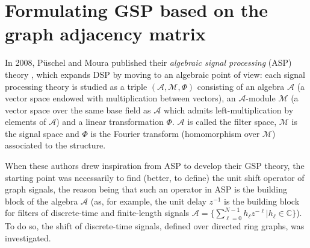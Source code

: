\section{Formulating GSP based on the graph adjacency matrix}
\label{sec:DSPG}

In 2008, P\"uschel and Moura published their \emph{algebraic signal processing} (ASP) theory \cite{puschel2008time,puschel2008space}, which expands DSP by moving to an algebraic point of view: each signal processing theory is studied as a triple $ (\mathscr{A}, \mathscr{M}, \Phi) $ consisting of an algebra $ \mathscr{A} $ (a vector space endowed with multiplication between vectors), an $ \mathscr{A} $-module $ \mathscr{M} $ (a vector space over the same base field as $ \mathscr{A} $ which admits left-multiplication by elements of $ \mathscr{A} $) and a linear transformation $ \Phi $. $ \mathscr{A} $ is called the filter space, $ \mathscr{M} $ is the signal space and $ \Phi $ is the Fourier transform (homomorphism over $ \mathscr{M} $) associated to the structure.

When these authors drew inspiration from ASP to develop their GSP theory, the starting point was necessarily to find (better, to define) the unit shift operator of graph signals, the reason being that such an operator in ASP is the building block of the algebra $ \mathscr{A} $ (as, for example, the unit delay $ z^{-1} $ is the building block for filters of discrete-time and finite-length signals $ \mathscr{A}  = \{ \sum_{\ell=0}^{N-1} h_\ell z^{-\ell} | h_\ell \in \mathbb{C} \}$). To do so, the shift of discrete-time signals, defined over directed ring graphs, was investigated.

